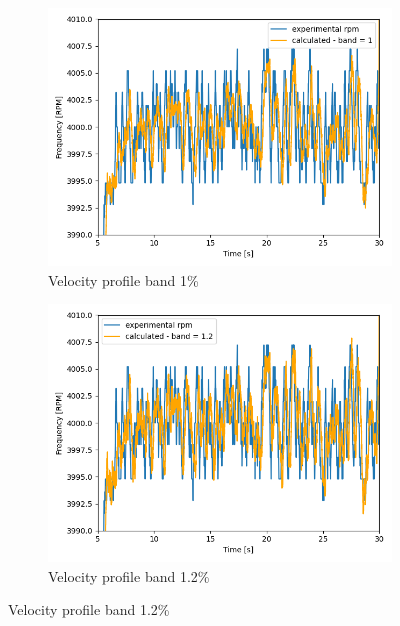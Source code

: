 \documentclass[10pt,fleqn,a4paper,twoside]{article}
\begin{document}
\begin{figure}[H]
\begin{subfigure}{0.4\textwidth}
            \label{fig:third}
        \end{subfigure}
        \centering
        \hfill
        \begin{subfigure}{0.4\textwidth}
            \includegraphics[width=\textwidth]{Figures/rpm_analysis_mic4_band_1.png}
            \caption{Velocity profile band 1\%}
            \label{fig:fourth}
        \end{subfigure}
        \centering
        \hfill
        \begin{subfigure}{0.4\textwidth}
            \includegraphics[width=\textwidth]{Figures/rpm_analysis_mic4_band_1.2.png}
            \caption{Velocity profile band 1.2\%}
            \label{fig:fifth}
        \end{subfigure}

\end{figure}
\end{document}
